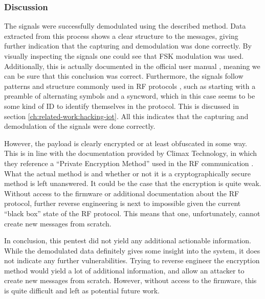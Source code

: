 \subsubsection{Discussion}
The signals were successfully demodulated using the described method. Data extracted from this process shows a clear structure to the messages, giving further indication that the capturing and demodulation was done correctly. By visually inspecting the signals one could see that FSK modulation was used. Additionally, this is actually documented in the official user manual \cite{hsgw-user-manual}, meaning we can be sure that this conclusion was correct. Furthermore, the signals follow patterns and structure commonly used in RF protocols \cite{hacking-the-iot-talk}, such as starting with a preamble of alternating symbols and a syncword, which in this case seems to be some kind of ID to identify themselves in the protocol. This is discussed in section \ref{ch:related-work:hacking-iot}. All this indicates that the capturing and demodulation of the signals were done correctly.

However, the payload is clearly encrypted or at least obfuscated in some way. This is in line with the documentation provided by Climax Technology, in which they reference a \enquote{Private Encryption Method} used in the RF communication \cite{hsgw-user-manual}. What the actual method is and whether or not it is a cryptographically secure method is left unanswered. It could be the case that the encryption is quite weak. Without access to the firmware or additional documentation about the RF protocol, further reverse engineering is next to impossible given the current \enquote{black box} state of the RF protocol. This means that one, unfortunately, cannot create new messages from scratch.

In conclusion, this pentest did not yield any additional actionable information. While the demodulated data definitely gives some insight into the system, it does not indicate any further vulnerabilities. Trying to reverse engineer the encryption method would yield a lot of additional information, and allow an attacker to create new messages from scratch. However, without access to the firmware, this is quite difficult and left as potential future work.
